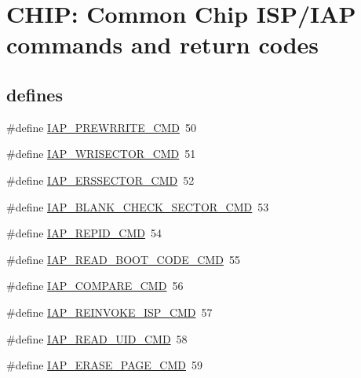 \hypertarget{group___c_o_m_m_o_n___i_a_p}{}\section{C\+H\+IP\+: Common Chip I\+S\+P/\+I\+AP commands and return codes}
\label{group___c_o_m_m_o_n___i_a_p}
\subsection*{\textquotesingle{}defines\textquotesingle{}}
\begin{DoxyCompactItemize}
\item 
\#define \hyperlink{group___c_o_m_m_o_n___i_a_p_ga540234bb0f525a06770175699d01063b}{I\+A\+P\+\_\+\+P\+R\+E\+W\+R\+R\+I\+T\+E\+\_\+\+C\+MD}~50
\item 
\#define \hyperlink{group___c_o_m_m_o_n___i_a_p_ga9eb15375e6dd4de560a7d43b4483a293}{I\+A\+P\+\_\+\+W\+R\+I\+S\+E\+C\+T\+O\+R\+\_\+\+C\+MD}~51
\item 
\#define \hyperlink{group___c_o_m_m_o_n___i_a_p_gad212cc38d91507366f07f9393e42eaec}{I\+A\+P\+\_\+\+E\+R\+S\+S\+E\+C\+T\+O\+R\+\_\+\+C\+MD}~52
\item 
\#define \hyperlink{group___c_o_m_m_o_n___i_a_p_ga2117bbba83cf2110a3fde4cafe189784}{I\+A\+P\+\_\+\+B\+L\+A\+N\+K\+\_\+\+C\+H\+E\+C\+K\+\_\+\+S\+E\+C\+T\+O\+R\+\_\+\+C\+MD}~53
\item 
\#define \hyperlink{group___c_o_m_m_o_n___i_a_p_gae385db2542e6b2c8b8417cf1b929fcb1}{I\+A\+P\+\_\+\+R\+E\+P\+I\+D\+\_\+\+C\+MD}~54
\item 
\#define \hyperlink{group___c_o_m_m_o_n___i_a_p_ga8d0f5e06feea423e15ee0238534f80ea}{I\+A\+P\+\_\+\+R\+E\+A\+D\+\_\+\+B\+O\+O\+T\+\_\+\+C\+O\+D\+E\+\_\+\+C\+MD}~55
\item 
\#define \hyperlink{group___c_o_m_m_o_n___i_a_p_gaa63a66d010441cd1b5837742455cf075}{I\+A\+P\+\_\+\+C\+O\+M\+P\+A\+R\+E\+\_\+\+C\+MD}~56
\item 
\#define \hyperlink{group___c_o_m_m_o_n___i_a_p_gad1f3638abcb5134b6fb6aceb67a4bb2c}{I\+A\+P\+\_\+\+R\+E\+I\+N\+V\+O\+K\+E\+\_\+\+I\+S\+P\+\_\+\+C\+MD}~57
\item 
\#define \hyperlink{group___c_o_m_m_o_n___i_a_p_gad2458645f1cf815f56f205bd7f7fd1af}{I\+A\+P\+\_\+\+R\+E\+A\+D\+\_\+\+U\+I\+D\+\_\+\+C\+MD}~58
\item 
\#define \hyperlink{group___c_o_m_m_o_n___i_a_p_ga24604c568e67c76aee924f9439426111}{I\+A\+P\+\_\+\+E\+R\+A\+S\+E\+\_\+\+P\+A\+G\+E\+\_\+\+C\+MD}~59

\end{DoxyCompactItemize}
